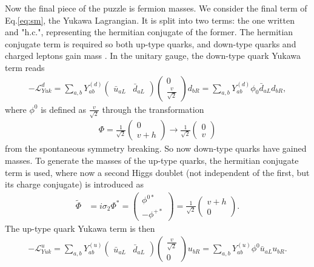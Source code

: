 \documentclass[a4paper,12pt]{article}
\begin{document}
Now the final piece of the puzzle is fermion masses. 
We consider the final term of Eq.\eqref{eq:sm}, the Yukawa Lagrangian. 
It is split into two terms: the one written and "h.c.", representing the hermitian conjugate of the former.
The hermitian conjugate term is required so both up-type quarks, and down-type quarks and charged leptons gain mass \cite{kane}. 
In the unitary gauge, the down-type quark Yukawa term reads
\begin{align}
    \label{eq:yuk}
    -\mathcal{L}_{Yuk}^d = \sum_{a,b} Y^{(d)}_{ab} \begin{pmatrix} \bar{u}_{aL} & \bar{d}_{aL}\end{pmatrix}\begin{pmatrix}0\\\frac{v}{\sqrt{2}}\end{pmatrix}d_{bR} = \sum_{a,b}Y^{(d)}_{ab}\phi_0\bar{d}_{aL}d_{bR},
\end{align}
where $\phi^0$ is defined as $\frac{v}{\sqrt{2}}$ through the transformation
\begin{align}
    \label{eq:vtoh}
    \Phi = \frac{1}{\sqrt{2}}\begin{pmatrix}0\\v+h\end{pmatrix}\to\frac{1}{\sqrt{2}}\begin{pmatrix}0\\v\end{pmatrix}
\end{align}
from the spontaneous symmetry breaking. 
So now down-type quarks have gained masses. 
To generate the masses of the up-type quarks, the hermitian conjugate term is used, where now a second Higgs doublet (not independent of the first, but its charge conjugate) is introduced as
\begin{align}
    \label{eq:highc}
    \tilde{\Phi} &= i\sigma_2\Phi^* = \begin{pmatrix}\phi^{0*}\\-\phi^{+*}\end{pmatrix} = \frac{1}{\sqrt{2}}\begin{pmatrix}v+h\\0\end{pmatrix}.
\end{align}
The up-type quark Yukawa term is then
\begin{align}
    \label{eq:yukhc}
    -\mathcal{L}_{Yuk}^u = \sum_{a,b} Y^{(u)}_{ab}\begin{pmatrix}\bar{u}_{aL} & \bar{d}_{aL}\end{pmatrix}\begin{pmatrix}\frac{v}{\sqrt{2}}\\0\end{pmatrix}u_{bR} = \sum_{a,b}Y^{(u)}_{ab}\phi^0\bar{u}_{aL}u_{bR}.
\end{align}
\end{document}

